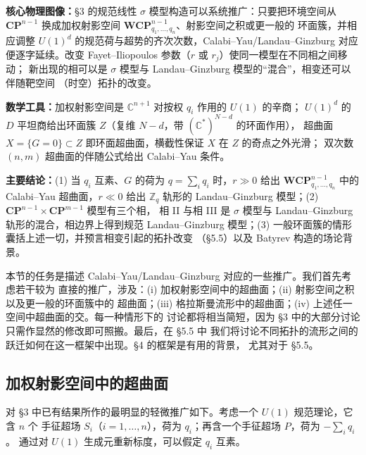 \begin{keytakeaway}
\textbf{核心物理图像：}§3 的规范线性 $\sigma$ 模型构造可以系统推广：只要把环境空间从
$\mathbf{CP}^{n-1}$ 换成加权射影空间 $\mathbf{WCP}^{n-1}_{q_1,\dots,q_n}$、射影空间之积或更一般的
环面簇，并相应调整 $U(1)^d$ 的规范荷与超势的齐次次数，Calabi--Yau/Landau--Ginzburg
对应便逐字延续。改变 Fayet--Iliopoulos 参数（$r$ 或 $r_j$）使同一模型在不同相之间移动；
新出现的相可以是 $\sigma$ 模型与 Landau--Ginzburg 模型的“混合”，相变还可以伴随靶空间
（时空）拓扑的改变。

\par\textbf{数学工具：}加权射影空间是 $\mathbb{C}^{n+1}$ 对按权 $q_i$ 作用的 $U(1)$ 的辛商；
$U(1)^d$ 的 $D$ 平坦商给出环面簇 $Z$（复维 $N-d$，带 $(\mathbb{C}^*)^{N-d}$ 的环面作用），
超曲面 $X=\{G=0\}\subset Z$ 即环面超曲面，横截性保证 $X$ 在 $Z$ 的奇点之外光滑；
双次数 $(n,m)$ 超曲面的伴随公式给出 Calabi--Yau 条件。

\par\textbf{主要结论：}(1) 当 $q_i$ 互素、$G$ 的荷为 $q=\sum_i q_i$ 时，$r\gg0$ 给出
$\mathbf{WCP}^{n-1}_{q_1,\dots,q_n}$ 中的 Calabi--Yau 超曲面，$r\ll0$ 给出 $\mathbb{Z}_q$ 轨形的
Landau--Ginzburg 模型；(2) $\mathbf{CP}^{n-1}\times\mathbf{CP}^{m-1}$ 模型有三个相，
相 II 与相 III 是 $\sigma$ 模型与 Landau--Ginzburg 轨形的混合，相边界上得到规范
Landau--Ginzburg 模型；(3) 一般环面簇的情形囊括上述一切，并预言相变引起的拓扑改变
（§5.5）以及 Batyrev 构造的场论背景。
\end{keytakeaway}

本节的任务是描述 Calabi--Yau/Landau--Ginzburg 对应的一些推广。我们首先考虑若干较为
直接的推广，涉及：(i) 加权射影空间中的超曲面；(ii) 射影空间之积以及更一般的环面簇中的
超曲面；(iii) 格拉斯曼流形中的超曲面；(iv) 上述任一空间中超曲面的交。每一种情形下的
讨论都将相当简短，因为 §3 中的大部分讨论只需作显然的修改即可照搬。最后，在 §5.5 中
我们将讨论不同拓扑的流形之间的跃迁如何在这一框架中出现。§4 的框架是有用的背景，
尤其对于 §5.5。

\label{op:50}

\subsection{加权射影空间中的超曲面}

对 §3 中已有结果所作的最明显的轻微推广如下。考虑一个 $U(1)$ 规范理论，它含 $n$ 个
手征超场 $S_i$（$i=1,\dots,n$），荷为 $q_i$；再含一个手征超场 $P$，荷为 $-\sum_i q_i$。
通过对 $U(1)$ 生成元重新标度，可以假定 $q_i$ 互素。

